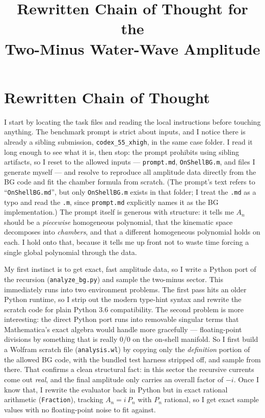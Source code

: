 \documentclass{article}
\title{Rewritten Chain of Thought for the\\
Two-Minus Water-Wave Amplitude}
\author{}
\date{}
\begin{document}
\maketitle


\section*{Rewritten Chain of Thought}

I start by locating the task files and reading the local instructions before
touching anything. The benchmark prompt is strict about inputs, and I notice
there is already a sibling submission, \texttt{codex\_55\_xhigh}, in the same
case folder. I read it long enough to see what it is, then stop: the prompt
prohibits using sibling artifacts, so I reset to the allowed inputs ---
\texttt{prompt.md}, \texttt{OnShellBG.m}, and files I generate myself --- and
resolve to reproduce all amplitude data directly from the BG code and fit the
chamber formula from scratch. (The prompt's text refers to ``\texttt{OnShellBG.md}'',
but only \texttt{OnShellBG.m} exists in that folder; I treat the \texttt{.md} as
a typo and read the \texttt{.m}, since \texttt{prompt.md} explicitly names it as
the BG implementation.) The prompt itself is generous with structure: it tells
me $A_n$ should be a \emph{piecewise} homogeneous polynomial, that the kinematic
space decomposes into \emph{chambers}, and that a different homogeneous
polynomial holds on each. I hold onto that, because it tells me up front not to
waste time forcing a single global polynomial through the data.

My first instinct is to get exact, fast amplitude data, so I write a Python port
of the recursion (\texttt{analyze\_bg.py}) and sample the two-minus sector. This
immediately runs into two environment problems. The first pass hits an older
Python runtime, so I strip out the modern type-hint syntax and rewrite the
scratch code for plain Python 3.6 compatibility. The second problem is more
interesting: the direct Python port runs into removable singular terms that
Mathematica's exact algebra would handle more gracefully --- floating-point
divisions by something that is really $0/0$ on the on-shell manifold. So I first
build a Wolfram scratch file (\texttt{analysis.wl}) by copying only the
\emph{definition} portion of the allowed BG code, with the bundled test harness
stripped off, and sample from there. That confirms a clean structural fact: in
this sector the recursive currents come out \emph{real}, and the final amplitude
only carries an overall factor of $-i$. Once I know that, I rewrite the evaluator
back in Python but in exact rational arithmetic (\texttt{Fraction}), tracking
$A_n=i\,P_n$ with $P_n$ rational, so I get exact sample values with no
floating-point noise to fit against.
\end{document}
